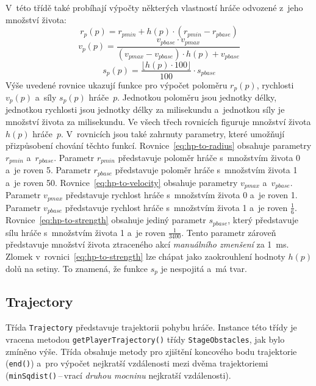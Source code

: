 V~této třídě také probíhají výpočty některých vlastností hráče odvozené z~jeho množství života:
\begin{equation}
    \label{eq:hp-to-radius}
    r_p(p) = r_{pmin} + h(p) \cdot (r_{pmin} - r_{pbase})
\end{equation}
\begin{equation}
    \label{eq:hp-to-velocity}
    v_p(p) = \frac{v_{pbase} \cdot v_{pmax}}{(v_{pmax} - v_{pbase}) \cdot h(p) + v_{pbase}}
\end{equation}
\begin{equation}
    \label{eq:hp-to-strength}
    s_p(p) = \frac{\lfloor h(p) \cdot 100 \rfloor}{100} \cdot s_{pbase}
\end{equation}
Výše uvedené rovnice ukazují funkce pro výpočet poloměru $r_p(p)$, rychlosti $v_p(p)$ a~síly $s_p(p)$ hráče~$p$. Jednotkou poloměru jsou jednotky délky, jednotkou rychlosti jsou jednotky délky za milisekundu a~jednotkou síly je množství života za milisekundu. Ve všech třech rovnicích figuruje množství života $h(p)$ hráče~$p$. V~rovnicích jsou také zahrnuty parametry, které umožňují přizpůsobení chování těchto funkcí. Rovnice~\eqref{eq:hp-to-radius} obsahuje parametry $r_{pmin}$ a~$r_{pbase}$. Parametr $r_{pmin}$ představuje poloměr hráče s~množstvím života 0 a~je roven 5. Parametr $r_{pbase}$ představuje poloměr hráče s~množstvím života 1 a~je roven 50. Rovnice~\eqref{eq:hp-to-velocity} obsahuje parametry $v_{pmax}$ a~$v_{pbase}$. Parametr $v_{pmax}$ představuje rychlost hráče s~množstvím života 0 a~je roven 1. Parametr $v_{pbase}$ představuje rychlost hráče s~množstvím života 1 a~je roven $\frac{1}{6}$. Rovnice~\eqref{eq:hp-to-strength} obsahuje jediný parametr $s_{pbase}$, který představuje sílu hráče s~množstvím života 1 a~je roven $\frac{1}{3400}$. Tento parametr zároveň představuje množství života ztraceného akcí \emph{manuálního zmenšení} za 1
\,ms. Zlomek v~rovnici~\eqref{eq:hp-to-strength} lze chápat jako zaokrouhlení hodnoty $h(p)$ dolů na setiny. To znamená, že funkce $s_p$ je nespojitá a~má  tvar.

\subsection*{Trajectory}

Třída \texttt{Trajectory} představuje trajektorii pohybu hráče. Instance této třídy je vracena metodou \texttt{getPlayerTrajectory()} třídy \texttt{StageObstacles}, jak bylo zmíněno výše. Třída obsahuje metody pro zjištění koncového bodu trajektorie (\texttt{end()}) a~pro výpočet nejkratší vzdálenosti mezi dvěma trajektoriemi (\texttt{minSqdist()}\,--\,vrací \emph{druhou mocninu} nejkratší vzdálenosti).


